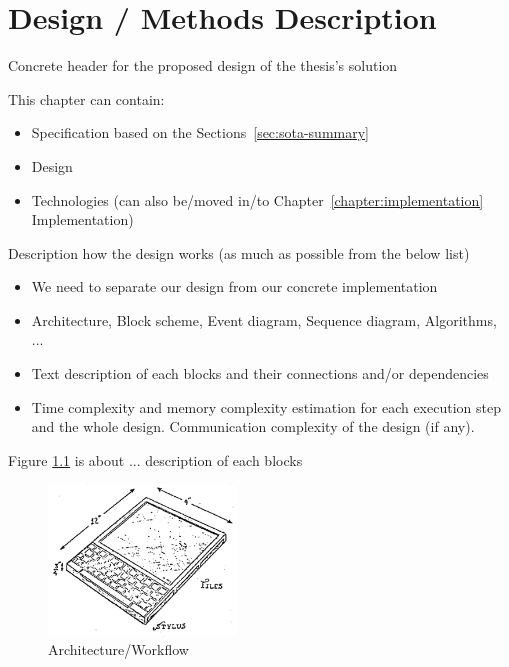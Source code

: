 \chapter{Design / Methods Description}
\label{chapter:design}

Concrete header for the proposed design of the thesis's solution

This chapter can contain:
\begin{itemize}
    \item Specification based on the Sections~\ref{sec:sota-summary}
    \item Design
    \item Technologies (can also be/moved in/to Chapter~\ref{chapter:implementation} Implementation)
\end{itemize}

Description how the design works (as much as possible from the below list)
\begin{itemize}
    \item We need to separate our design from our concrete implementation
    
    \item Architecture, Block scheme, Event diagram, Sequence diagram, Algorithms, ...
    
    \item Text description of each blocks and their connections and/or dependencies

    \item Time complexity and memory complexity estimation for each execution step and the whole design. Communication complexity of the design (if any).
\end{itemize}


Figure \ref{fig:dynabook} is about ... description of each blocks
\begin{figure}[h]
    \begin{centering}
    \includegraphics[width=5cm]{assets/images/Dynabook.png}
    \par\end{centering}
    \caption{Architecture/Workflow}
    \label{fig:dynabook}
\end{figure}